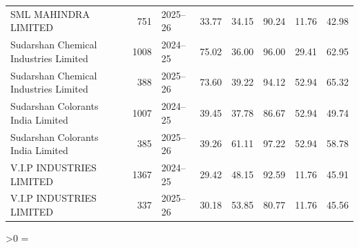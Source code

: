 \begin{lrbox}{\pairedyearoverviewbox}
\begin{minipage}{\linewidth}
\begin{table}[H]
\begin{singlepagetable}
\begin{tabular}{@{}L{5.1cm}rlrrrrr@{}}
SML MAHINDRA LIMITED & 751 & 2025--26 & 33.77 & 34.15 & 90.24 & 11.76 & 42.98 \\
Sudarshan Chemical Industries Limited & 1008 & 2024--25 & 75.02 & 36.00 & 96.00 & 29.41 & 62.95 \\
Sudarshan Chemical Industries Limited & 388 & 2025--26 & 73.60 & 39.22 & 94.12 & 52.94 & 65.32 \\
Sudarshan Colorants India Limited & 1007 & 2024--25 & 39.45 & 37.78 & 86.67 & 52.94 & 49.74 \\
Sudarshan Colorants India Limited & 385 & 2025--26 & 39.26 & 61.11 & 97.22 & 52.94 & 58.78 \\
V.I.P INDUSTRIES LIMITED & 1367 & 2024--25 & 29.42 & 48.15 & 92.59 & 11.76 & 45.91 \\
V.I.P INDUSTRIES LIMITED & 337 & 2025--26 & 30.18 & 53.85 & 80.77 & 11.76 & 45.56 \\
\bottomrule
\end{tabular}
\end{singlepagetable}
\end{table}
\end{minipage}
\end{lrbox}
\ifdim\dimexpr\ht\pairedyearoverviewbox+\dp\pairedyearoverviewbox\relax>\textheight
  \PackageError{GRASP-layout}{Paired-year tables exceed one page: \the\dimexpr\ht\pairedyearoverviewbox+\dp\pairedyearoverviewbox\relax}{Reduce local spacing while retaining the records and explanations.}
\fi
\noindent\usebox{\pairedyearoverviewbox}\par

\ifnum{}>0\relax
  \ifnum{}=\relax\else
    \PackageError{GRASP-layout}{Paired-year tables must share one page}{Keep the paired-year overview in one unbroken box.}
  \fi
\fi
